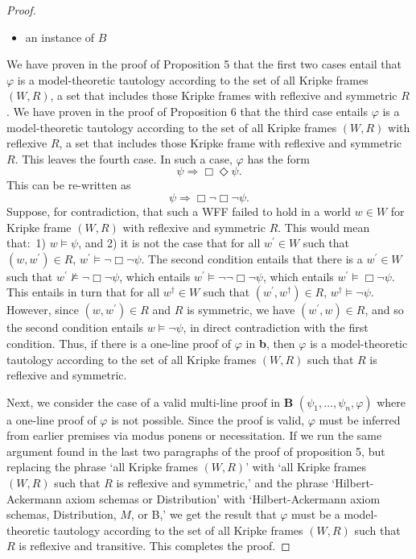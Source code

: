 \documentclass[11pt]{article}
\theoremstyle{definition}
\theoremstyle{remark}
\begin{document}
\begin{proof}
\begin{itemize}
    \item an instance of $B$
    \end{itemize}
    We have proven in the proof of Proposition 5 that the first two cases entail that $\varphi$ is a model-theoretic tautology according to the set of all Kripke frames $(W,R)$, a set that includes those Kripke frames with reflexive and symmetric $R$. We have proven in the proof of Proposition 6 that the third case entails $\varphi$ is a model-theoretic tautology according to the set of all Kripke frames $(W,R)$ with reflexive $R$, a set that includes those Kripke frame with reflexive and symmetric $R$. This leaves the fourth case. In such a case, $\varphi$ has the form
    $$\psi\Rightarrow\Box\Diamond\psi.$$
    This can be re-written as
    $$\psi\Rightarrow\Box\neg\Box\neg\psi.$$
    Suppose, for contradiction, that such a WFF failed to hold in a world $w\in W$ for Kripke frame $(W,R)$ with reflexive and symmetric $R$. This would mean that:\ 1) $w\vDash\psi$, and 2) it is not the case that for all $w^{\prime}\in W$ such that $(w,w^{\prime})\in R$, $w^{\prime}\vDash \neg\Box\neg\psi$. The second condition entails that there is a $w^{\prime}\in W$ such that $w^{\prime}\not\vDash \neg\Box\neg\psi$, which entails $w^{\prime}\vDash \neg\neg\Box\neg\psi$, which entails $w^{\prime}\vDash \Box\neg\psi$. This entails in turn that for all $w^{\dagger}\in W$ such that $(w^{\prime},w^{\dagger})\in R$, $w^{\dagger}\vDash\neg\psi$. However, since $(w,w^{\prime})\in R$ and $R$ is symmetric, we have $(w^{\prime},w)\in R$, and so the second condition entails $w\vDash\neg\psi$, in direct contradiction with the first condition. Thus, if there is a one-line proof of $\varphi$ in \textbf{b}, then $\varphi$ is a model-theoretic tautology according to the set of all Kripke frames $(W,R)$ such that $R$ is reflexive and symmetric.\par

    Next, we consider the case of a valid multi-line proof in \textbf{B} $(\psi_{1},\dots,\psi_{n},\varphi)$ where a one-line proof of $\varphi$ is not possible. Since the proof is valid, $\varphi$ must be inferred from earlier premises via modus ponens or necessitation. If we run the same argument found in the last two paragraphs of the proof of proposition 5, but replacing the phrase `all Kripke frames $(W,R)$' with `all Kripke frames $(W,R)$ such that $R$ is reflexive and symmetric,' and the phrase `Hilbert-Ackermann axiom schemas or Distribution' with `Hilbert-Ackermann axiom schemas, Distribution, $M$, or B,' we get the result that $\varphi$ must be a model-theoretic tautology according to the set of all Kripke frames $(W,R)$ such that $R$ is reflexive and transitive. This completes the proof.
\end{proof}
\end{document}
